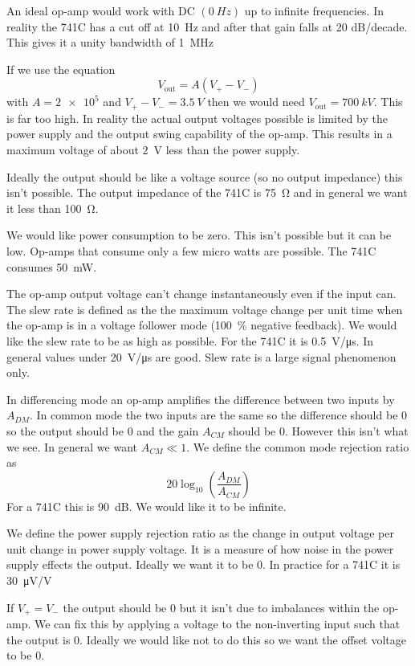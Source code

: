 \documentclass{article}
\begin{document}
    An ideal op-amp would work with DC \((\SI{0}{Hz})\) up to infinite frequencies.
    In reality the 741C has a cut off at \SI{10}{Hz} and after that gain falls at 20 dB/decade.
    This gives it a unity bandwidth of \SI{1}{MHz}
    
    If we use the equation
    \[V_\text{out} = A(V_+-V_-)\]
    with \(A = \num{2e5}\) and \(V_+-V_- = \SI{3.5}{V}\) then we would need \(V_\text{out} = \SI{700}{kV}\).
    This is far too high.
    In reality the actual output voltages possible is limited by the power supply and the output swing capability of the op-amp.
    This results in a maximum voltage of about \SI{2}{V} less than the power supply.
    
    Ideally the output should be like a voltage source (so no output impedance) this isn't possible.
    The output impedance of the 741C is \SI{75}{\ohm} and in general we want it less than \SI{100}{\ohm}.
    
    We would like power consumption to be zero.
    This isn't possible but it can be low.
    Op-amps that consume only a few micro watts are possible.
    The 741C consumes \SI{50}{mW}.
    
    The op-amp output voltage can't change instantaneously even if the input can.
    The slew rate is defined as the the maximum voltage change per unit time when the op-amp is in a voltage follower mode (\SI{100}{\%} negative feedback).
    We would like the slew rate to be as high as possible.
    For the 741C it is \SI{0.5}{V/\micro s}.
    In general values under \SI{20}{V/\micro s} are good.
    Slew rate is a large signal phenomenon only.
    
    In differencing mode an op-amp amplifies the difference between two inputs by \(A_{DM}\).
    In common mode the two inputs are the same so the difference should be 0 so the output should be 0 and the gain \(A_{CM}\) should be 0.
    However this isn't what we see.
    In general we want \(A_{CM}\ll 1\).
    We define the common mode rejection ratio as
    \[20\log_{10}\left(\frac{A_{DM}}{A_{CM}}\right)\]
    For a 741C this is \SI{90}{dB}.
    We would like it to be infinite.
    
    We define the power supply rejection ratio as the change in output voltage per unit change in power supply voltage.
    It is a measure of how noise in the power supply effects the output.
    Ideally we want it to be 0.
    In practice for a 741C it is \SI{30}{\micro V/V}
    
    If \(V_+=V_-\) the output should be 0 but it isn't due to imbalances within the op-amp.
    We can fix this by applying a voltage to the non-inverting input such that the output is 0.
    Ideally we would like not to do this so we want the offset voltage to be 0.
    
\end{document}
